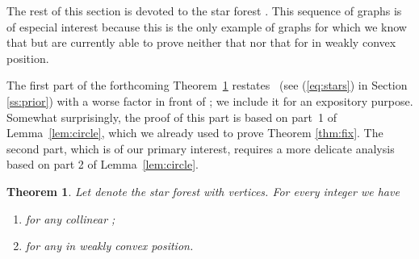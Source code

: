 \documentclass[reqno,12pt]{amsart}
\newtheorem{theorem}{Theorem}[section]
\newenvironment{bfenumerate}{\renewcommand{\labelenumi}{{\bf\theenumi.}}\renewcommand{\labelenumii}{{\bf(\theenumii)}}\begin{enumerate}}{\end{enumerate}}
\newcommand{\refeq}[1]{(\ref{eq:#1})}
\begin{document}
The rest of this section is devoted to the star forest .
This sequence of graphs is of especial interest because this is the only
example of graphs for which we know that  but are currently able
to prove neither that  nor that  for 
in weakly convex position.

The first part of the forthcoming Theorem~\ref{thm:stars} restates~\cite[Theorem 5]{Bose}
(see \refeq{stars} in Section \ref{ss:prior})
with a worse factor in front of ; we include it for an expository
purpose. Somewhat surprisingly, the proof of this part is based on  part~1 of
Lemma~\ref{lem:circle}, which we already used to prove Theorem \ref{thm:fix}.
The second part, which is of our primary interest, requires a more delicate
analysis based on part 2 of Lemma~\ref{lem:circle}.

\begin{theorem}\label{thm:stars}
Let  denote the star forest with  vertices.
For every integer  we have
\begin{bfenumerate}
\item
 for any collinear ;
\item
 for any  in weakly convex position.
\end{bfenumerate}
\end{theorem}
\end{document}
